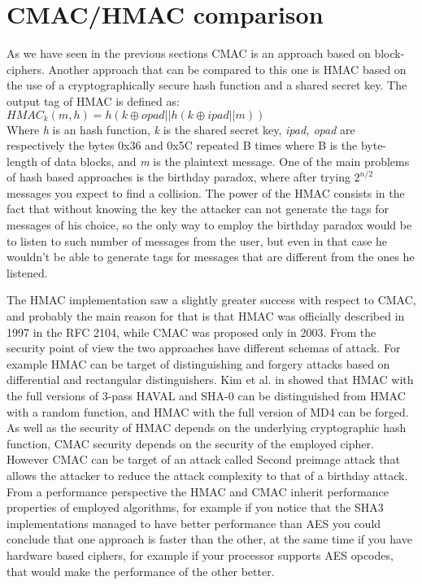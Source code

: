 \documentclass[11pt]{article}
\begin{document}
\section{CMAC/HMAC comparison}
As we have seen in the previous sections CMAC is an approach based on block-ciphers. Another approach that can be compared to this one is HMAC \cite{rfc2104} based on the use of a cryptographically secure hash function and a shared secret key. The output tag of HMAC is defined as:\\
$HMAC_k(m, h) = h(k \oplus opad || h(k \oplus ipad || m))$\\
Where \textit{h} is an hash function, \textit{k} is the shared secret key, \textit{ipad, opad} are respectively the bytes 0x36 and 0x5C repeated B times where B is the byte-length of data blocks, and \textit{m} is the plaintext message. One of the main problems of hash based approaches is the birthday paradox, where after trying $2^{n/2}$ messages you expect to find a collision. The power of the HMAC consists in the fact that without knowing the key the attacker can not generate the tags for messages of his choice, so the only way to employ the birthday paradox would be to listen to such number of messages from the user, but even in that case he wouldn't be able to generate tags for messages that are different from the ones he listened.

The HMAC implementation saw a slightly greater success with respect to CMAC, and probably the main reason for that is that HMAC was officially described in 1997 in the RFC 2104, while CMAC was proposed only in 2003. From the security point of view the two approaches have different schemas of attack. For example HMAC can be target of distinguishing and forgery attacks based on differential and rectangular distinguishers. Kim et al. in \cite{distinguisher} showed that HMAC with the full versions of 3-pass HAVAL and SHA-0 can be distinguished from HMAC with a random function, and HMAC with the full version of MD4 can be forged. As well as the security of HMAC depends on the underlying cryptographic hash function, CMAC security depends on the security of the employed cipher. However CMAC can be target of an attack called Second preimage attack \cite{secondpreimage} that allows the attacker to reduce the attack complexity to that of a birthday attack.
From a performance perspective the HMAC and CMAC inherit performance properties of employed algorithms, for example if you notice that the SHA3 implementations managed to have better performance than AES you could conclude that one approach is faster than the other, at the same time if you have hardware based ciphers, for example if your processor supports AES opcodes, that would make the performance of the other better.
\end{document}
